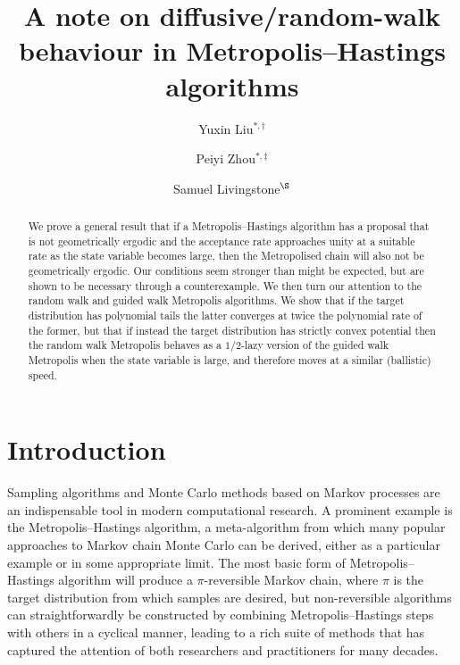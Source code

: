 \documentclass{article}
\title{\huge A note on diffusive/random-walk behaviour in Metropolis--Hastings algorithms}
\author{Yuxin Liu$^{*, \dagger}$}
\author{Peiyi Zhou$^{*, \ddagger}$}
\author{Samuel Livingstone$^{\S}$}
\affil{Department of Statistical Science, University College London}
\theoremstyle{definition}
\theoremstyle{plain}
\begin{document}
\maketitle

\insert{}
\insert{}
\insert{}
\insert{}

\begin{abstract}
We prove a general result that if a Metropolis--Hastings algorithm has a proposal that is not geometrically ergodic and the acceptance rate approaches unity at a suitable rate as the state variable becomes large, then the Metropolised chain will also not be geometrically ergodic. Our conditions seem stronger than might be expected, but are shown to be necessary through a counterexample. We then turn our attention to the random walk and guided walk Metropolis algorithms. We show that if the target distribution has polynomial tails the latter converges at twice the polynomial rate of the former, but that if instead the target distribution has strictly convex potential then the random walk Metropolis behaves as a $1/2$-lazy version of the guided walk Metropolis when the state variable is large, and therefore moves at a similar (ballistic) speed.
\end{abstract}


\section{Introduction}

Sampling algorithms and Monte Carlo methods based on Markov processes are an indispensable tool in modern computational research.  A prominent example is the Metropolis--Hastings algorithm, a meta-algorithm from which many popular approaches to Markov chain Monte Carlo can be derived, either as a particular example or in some appropriate limit.  The most basic form of Metropolis--Hastings algorithm will produce a $\pi$-reversible Markov chain, where $\pi$ is the target distribution from which samples are desired, but non-reversible algorithms can straightforwardly be constructed by combining Metropolis--Hastings steps with others in a cyclical manner, leading to a rich suite of methods that has captured the attention of both researchers and practitioners for many decades.
\end{document}
